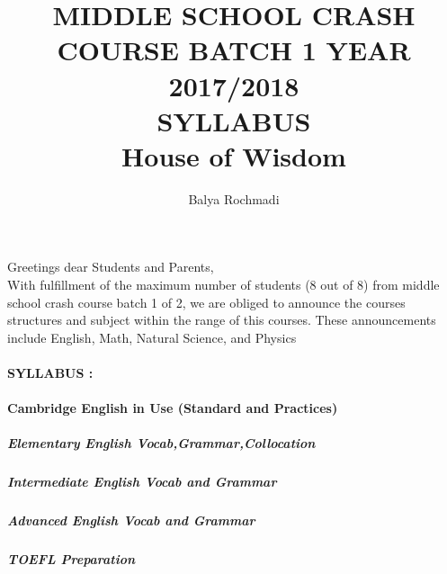 \documentclass[12pt,a4paper]{article}
\author{Balya Rochmadi}
\title{MIDDLE SCHOOL CRASH COURSE BATCH 1 YEAR 2017/2018 \\ SYLLABUS \\  House of Wisdom}
\begin{document}
	\maketitle
	\paragraph*{}
		Greetings dear Students and Parents,\\
		With fulfillment of the maximum number of students (8 out of 8) from middle school crash course batch 1 of 2, we are obliged to announce the courses structures and subject within the range of this courses. These announcements include English, Math, Natural Science, and Physics    
		
	\paragraph{SYLLABUS : }	
	
	\paragraph{Cambridge English in Use (Standard and Practices)}
		\subparagraph{Elementary English Vocab,Grammar,Collocation }
		\subparagraph{Intermediate English Vocab and Grammar}
		\subparagraph{Advanced English Vocab and Grammar}
		\subparagraph{TOEFL Preparation}
	
		

	
\end{document}
